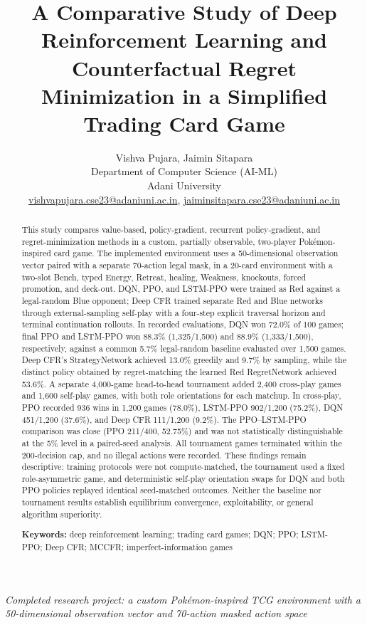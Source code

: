 \documentclass[11pt]{article}
\title{A Comparative Study of Deep Reinforcement Learning and\\Counterfactual Regret Minimization in a Simplified Trading Card Game}
\author{Vishva Pujara, Jaimin Sitapara\\[3pt]
\normalsize Department of Computer Science (AI-ML)\\
\normalsize Adani University\\
\small \href{mailto:vishvapujara.cse23@adaniuni.ac.in}{vishvapujara.cse23@adaniuni.ac.in},
\href{mailto:jaiminsitapara.cse23@adaniuni.ac.in}{jaiminsitapara.cse23@adaniuni.ac.in}}
\date{}
\begin{document}
\maketitle
\begin{center}
\large\textit{Completed research project: a custom Pokémon-inspired TCG environment with a 50-dimensional observation vector and 70-action masked action space}
\end{center}
\vspace{-0.5em}


\begin{abstract}

This study compares value-based, policy-gradient, recurrent policy-gradient, and regret-minimization methods in a custom, partially observable, two-player Pok\'emon-inspired card game. The implemented environment uses a 50-dimensional observation vector paired with a separate 70-action legal mask, in a 20-card environment with a two-slot Bench, typed Energy, Retreat, healing, Weakness, knockouts, forced promotion, and deck-out. DQN, PPO, and LSTM-PPO were trained as Red against a legal-random Blue opponent; Deep CFR trained separate Red and Blue networks through external-sampling self-play with a four-step explicit traversal horizon and terminal continuation rollouts. In recorded evaluations, DQN won 72.0\% of 100 games; final PPO and LSTM-PPO won 88.3\% (1,325/1,500) and 88.9\% (1,333/1,500), respectively, against a common 5.7\% legal-random baseline evaluated over 1,500 games. Deep CFR's StrategyNetwork achieved 13.0\% greedily and 9.7\% by sampling, while the distinct policy obtained by regret-matching the learned Red RegretNetwork achieved 53.6\%. A separate 4,000-game head-to-head tournament added 2,400 cross-play games and 1,600 self-play games, with both role orientations for each matchup. In cross-play, PPO recorded 936 wins in 1,200 games (78.0\%), LSTM-PPO 902/1,200 (75.2\%), DQN 451/1,200 (37.6\%), and Deep CFR 111/1,200 (9.2\%). The PPO--LSTM-PPO comparison was close (PPO 211/400, 52.75\%) and was not statistically distinguishable at the 5\% level in a paired-seed analysis. All tournament games terminated within the 200-decision cap, and no illegal actions were recorded. These findings remain descriptive: training protocols were not compute-matched, the tournament used a fixed role-asymmetric game, and deterministic self-play orientation swaps for DQN and both PPO policies replayed identical seed-matched outcomes. Neither the baseline nor tournament results establish equilibrium convergence, exploitability, or general algorithm superiority.

\par\smallskip\noindent\textbf{Keywords:} deep reinforcement learning; trading card games; DQN; PPO; LSTM-PPO; Deep CFR; MCCFR; imperfect-information games

\end{abstract}
\end{document}
